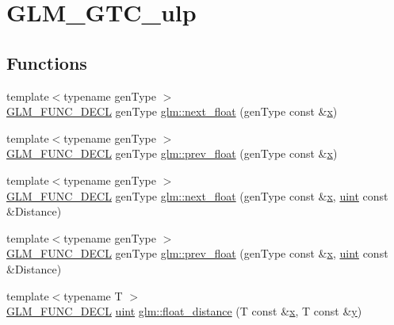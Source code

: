 \hypertarget{group__gtc__ulp}{}\section{G\+L\+M\+\_\+\+G\+T\+C\+\_\+ulp}
\label{group__gtc__ulp}
\subsection*{Functions}
\begin{DoxyCompactItemize}
\item 
{\footnotesize template$<$typename gen\+Type $>$ }\\\hyperlink{setup_8hpp_ab2d052de21a70539923e9bcbf6e83a51}{G\+L\+M\+\_\+\+F\+U\+N\+C\+\_\+\+D\+E\+CL} gen\+Type \hyperlink{group__gtc__ulp_gae516ae554faa6117660828240e8bdaf0}{glm\+::next\+\_\+float} (gen\+Type const \&\hyperlink{_s_d_l__opengl_8h_ad0e63d0edcdbd3d79554076bf309fd47}{x})
\item 
{\footnotesize template$<$typename gen\+Type $>$ }\\\hyperlink{setup_8hpp_ab2d052de21a70539923e9bcbf6e83a51}{G\+L\+M\+\_\+\+F\+U\+N\+C\+\_\+\+D\+E\+CL} gen\+Type \hyperlink{group__gtc__ulp_ga2fcbb7bfbfc595712bfddc51b0715b07}{glm\+::prev\+\_\+float} (gen\+Type const \&\hyperlink{_s_d_l__opengl_8h_ad0e63d0edcdbd3d79554076bf309fd47}{x})
\item 
{\footnotesize template$<$typename gen\+Type $>$ }\\\hyperlink{setup_8hpp_ab2d052de21a70539923e9bcbf6e83a51}{G\+L\+M\+\_\+\+F\+U\+N\+C\+\_\+\+D\+E\+CL} gen\+Type \hyperlink{group__gtc__ulp_gad107ec3d9697ef82032a33338a73ebdd}{glm\+::next\+\_\+float} (gen\+Type const \&\hyperlink{_s_d_l__opengl_8h_ad0e63d0edcdbd3d79554076bf309fd47}{x}, \hyperlink{group__core__precision_ga4fd29415871152bfb5abd588334147c8}{uint} const \&Distance)
\item 
{\footnotesize template$<$typename gen\+Type $>$ }\\\hyperlink{setup_8hpp_ab2d052de21a70539923e9bcbf6e83a51}{G\+L\+M\+\_\+\+F\+U\+N\+C\+\_\+\+D\+E\+CL} gen\+Type \hyperlink{group__gtc__ulp_gaa399d5b6472a70e8952f9b26ecaacdec}{glm\+::prev\+\_\+float} (gen\+Type const \&\hyperlink{_s_d_l__opengl_8h_ad0e63d0edcdbd3d79554076bf309fd47}{x}, \hyperlink{group__core__precision_ga4fd29415871152bfb5abd588334147c8}{uint} const \&Distance)
\item 
{\footnotesize template$<$typename T $>$ }\\\hyperlink{setup_8hpp_ab2d052de21a70539923e9bcbf6e83a51}{G\+L\+M\+\_\+\+F\+U\+N\+C\+\_\+\+D\+E\+CL} \hyperlink{group__core__precision_ga4fd29415871152bfb5abd588334147c8}{uint} \hyperlink{group__gtc__ulp_ga2e09bd6c8b0a9c91f6f5683d68245634}{glm\+::float\+\_\+distance} (T const \&\hyperlink{_s_d_l__opengl_8h_ad0e63d0edcdbd3d79554076bf309fd47}{x}, T const \&\hyperlink{_s_d_l__opengl_8h_a1675d9d7bb68e1657ff028643b4037e3}{y})

\end{DoxyCompactItemize}
